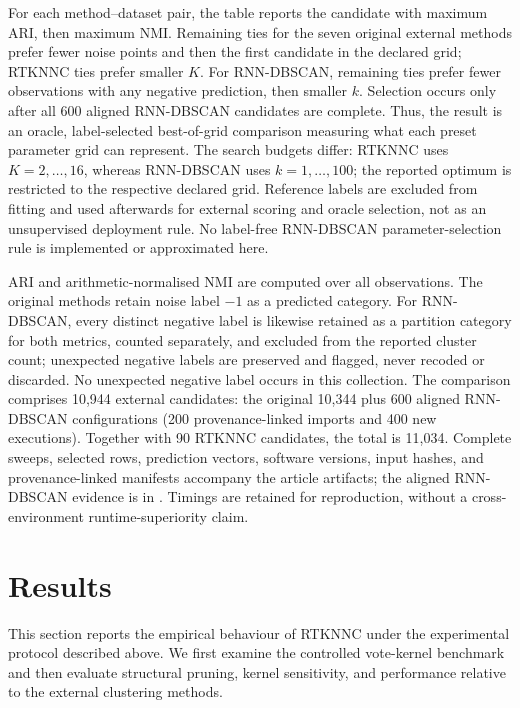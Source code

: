 \documentclass[review,12pt]{elsarticle}
\begin{document}
For each method--dataset pair, the table reports the candidate with maximum
ARI, then maximum NMI. Remaining ties for the seven original external methods
prefer fewer noise points and then the first candidate in the declared grid;
RTKNNC ties prefer smaller $K$. For RNN-DBSCAN, remaining ties prefer fewer
observations with any negative prediction, then smaller $k$. Selection occurs
only after all 600 aligned RNN-DBSCAN candidates are complete. Thus, the
result is an oracle, label-selected best-of-grid comparison measuring what
each preset parameter grid can represent. The search budgets differ:
RTKNNC uses $K=2,\ldots,16$, whereas RNN-DBSCAN uses $k=1,\ldots,100$;
the reported optimum is restricted to the respective declared grid.
Reference labels are excluded from fitting and used afterwards for external
scoring and oracle selection, not as an unsupervised deployment rule. No
label-free RNN-DBSCAN parameter-selection rule is implemented or
approximated here.

ARI and arithmetic-normalised NMI are computed over all observations. The
original methods retain noise label $-1$ as a predicted category. For
RNN-DBSCAN, every distinct negative label is likewise retained as a partition
category for both metrics, counted separately, and excluded from the reported
cluster count; unexpected negative labels are preserved and flagged, never
recoded or discarded. No unexpected negative label occurs in this collection.
The comparison comprises 10,944 external candidates: the original 10,344 plus
600 aligned RNN-DBSCAN configurations (200 provenance-linked imports and 400
new executions). Together with 90 RTKNNC candidates, the total is 11,034.
Complete sweeps, selected rows, prediction vectors, software versions,
input hashes, and provenance-linked manifests accompany the article artifacts;
the aligned RNN-DBSCAN evidence is in
. Timings are retained for
reproduction, without a cross-environment runtime-superiority claim.

\section{Results}\label{sec:results}

This section reports the empirical behaviour of RTKNNC under the experimental protocol described above. We first examine the controlled vote-kernel benchmark and then evaluate structural pruning, kernel sensitivity, and performance relative to the external clustering methods.
\end{document}
